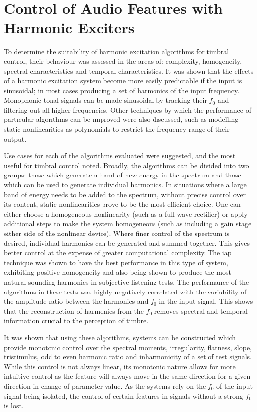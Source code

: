 \section{Control of Audio Features with Harmonic Exciters}
\label{sec:Conclusion-FeatureConrol}
	To determine the suitability of harmonic excitation algorithms for timbral control, their behaviour was assessed in
	the areas of: complexity, homogeneity, spectral characteristics and temporal characteristics. It was shown that the
	effects of a harmonic excitation system become more easily predictable if the input is sinusoidal; in most cases
	producing a set of harmonics of the input frequency. Monophonic tonal signals can be made sinusoidal by tracking
	their $f_{0}$ and filtering out all higher frequencies. Other techniques by which the performance of particular
	algorithms can be improved were also discussed, such as modelling static nonlinearities as polynomials to restrict
	the frequency range of their output.
	
	Use cases for each of the algorithms evaluated were suggested, and the most useful for timbral control noted.
	Broadly, the algorithms can be divided into two groups: those which generate a band of new energy in the spectrum
	and those which can be used to generate individual harmonics. In situations where a large band of energy needs to be
	added to the spectrum, without precise control over its content, static nonlinearities prove to be the most
	efficient choice. One can either choose a homogeneous nonlinearity (such as a full wave rectifier) or apply
	additional steps to make the system homogeneous (such as including a gain stage either side of the nonlinear
	device). Where finer control of the spectrum is desired, individual harmonics can be generated and summed together.
	This gives better control at the expense of greater computational complexity. The \acrshort{iap} technique was shown
	to have the best performance in this type of system, exhibiting positive homogeneity and also being shown to produce
	the most natural sounding harmonics in subjective listening tests. The performance of the algorithms in these tests
	was highly negatively correlated with the variability of the amplitude ratio between the harmonics and $f_{0}$ in
	the input signal. This shows that the reconstruction of harmonics from the $f_{0}$ removes spectral and temporal
	information crucial to the perception of timbre.

	It was shown that using these algorithms, systems can be constructed which provide monotonic control over the
	spectral moments, irregularity, flatness, slope, tristimulus, odd to even harmonic ratio and inharmonicity of a set
	of test signals. While this control is not always linear, its monotonic nature allows for more intuitive control as
	the feature will always move in the same direction for a given direction in change of parameter value. As the
	systems rely on the $f_{0}$ of the input signal being isolated, the control of certain features in signals without a
	strong $f_{0}$ is lost. 

